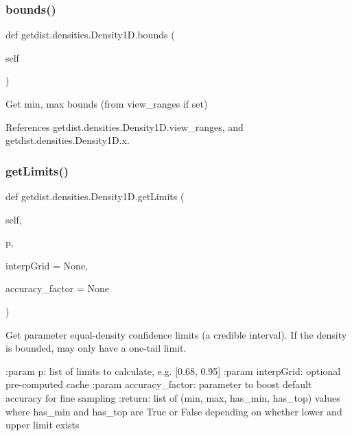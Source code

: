 \subsubsection{\texorpdfstring{bounds()}{bounds()}}
{\footnotesize\ttfamily def getdist.\+densities.\+Density1\+D.\+bounds (\begin{DoxyParamCaption}\item[{}]{self }\end{DoxyParamCaption})}

\begin{DoxyVerb}Get min, max bounds (from view_ranges if set)
\end{DoxyVerb}
 

References getdist.\+densities.\+Density1\+D.\+view\+\_\+ranges, and getdist.\+densities.\+Density1\+D.\+x.

\mbox{\label{classgetdist_1_1densities_1_1Density1D_a047d00eda8fabc15756ab9dae81a729a}} 
\subsubsection{\texorpdfstring{get\+Limits()}{getLimits()}}
{\footnotesize\ttfamily def getdist.\+densities.\+Density1\+D.\+get\+Limits (\begin{DoxyParamCaption}\item[{}]{self,  }\item[{}]{p,  }\item[{}]{interp\+Grid = {\ttfamily None},  }\item[{}]{accuracy\+\_\+factor = {\ttfamily None} }\end{DoxyParamCaption})}

\begin{DoxyVerb}Get parameter equal-density confidence limits (a credible interval). 
If the density is bounded, may only have a one-tail limit.

:param p: list of limits to calculate, e.g. [0.68, 0.95]
:param interpGrid: optional pre-computed cache
:param accuracy_factor: parameter to boost default accuracy for fine sampling
:return: list of (min, max, has_min, has_top) values 
where has_min and has_top are True or False depending on whether lower and upper limit exists
\end{DoxyVerb}
 

